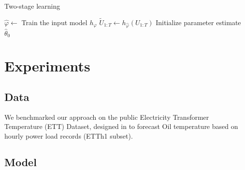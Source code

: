 \documentclass[journal]{IEEEtran}
\begin{document}
\begin{algorithm}
	\caption{Two-stage learning}
	\label{alg:particle_filter}
	\KwOut{$(\hat \varphi, \hat \theta)$}
	$\hat \varphi \gets$ Train the input model $h_\varphi$\;
	$\widetilde U_{1:T} \gets h_{\hat \varphi}(U_{1:T})$\;
	Initialize parameter estimate $\widehat \theta_0$\;

\end{algorithm}

\section{Experiments}
\label{sec:exp}
\subsection{Data}
\label{sub:data}
We benchmarked our approach on the public Electricity Transformer Temperature (ETT) Dataset, designed in \cite{Zhou2021Informer} to forecast Oil temperature based on hourly power load records (ETTh1 subset).

\subsection{Model}%
\label{sub:models}
\end{document}
